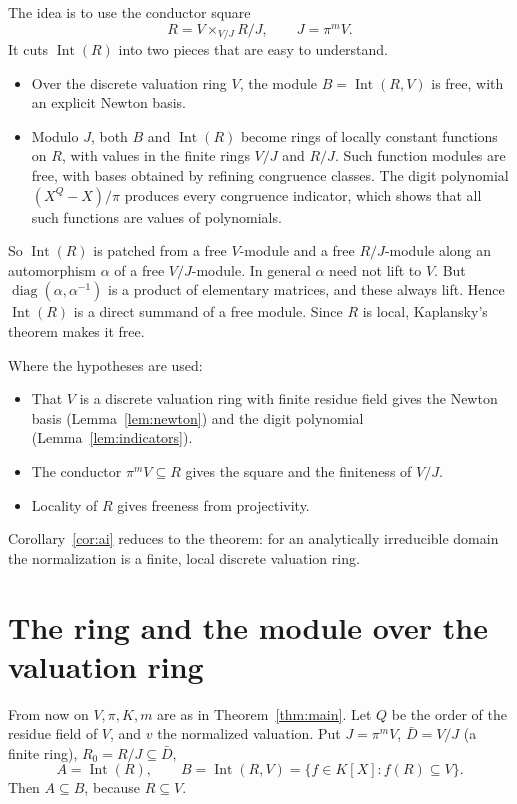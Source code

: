 \documentclass[11pt,a4paper]{article}
\theoremstyle{plain}
\theoremstyle{remark}
\newcommand{\Int}{\operatorname{Int}}
\begin{document}
The idea is to use the conductor square
\[
 R=V\times_{V/J}R/J,\qquad J=\pi^mV .
\]
It cuts $\Int(R)$ into two pieces that are easy to understand.
\begin{itemize}
\item Over the discrete valuation ring $V$, the module $B=\Int(R,V)$ is free, with an explicit Newton basis.
\item Modulo $J$, both $B$ and $\Int(R)$ become rings of locally constant functions on $R$, with values in the finite
rings $V/J$ and $R/J$. Such function modules are free, with bases obtained by refining congruence classes. The
digit polynomial $(X^Q-X)/\pi$ produces every congruence indicator, which shows that all such functions are values of
polynomials.
\end{itemize}
So $\Int(R)$ is patched from a free $V$-module and a free $R/J$-module along an automorphism $\alpha$ of a free
$V/J$-module. In general $\alpha$ need not lift to $V$. But $\operatorname{diag}(\alpha,\alpha^{-1})$ is a product
of elementary matrices, and these always lift. Hence $\Int(R)$ is a direct summand of a free module. Since $R$ is
local, Kaplansky's theorem makes it free.

Where the hypotheses are used:
\begin{itemize}
\item That $V$ is a discrete valuation ring with finite residue field gives the Newton basis (Lemma~\ref{lem:newton})
and the digit polynomial (Lemma~\ref{lem:indicators}).
\item The conductor $\pi^mV\subseteq R$ gives the square and the finiteness of $V/J$.
\item Locality of $R$ gives freeness from projectivity.
\end{itemize}
Corollary~\ref{cor:ai} reduces to the theorem: for an analytically irreducible domain the normalization is a finite,
local discrete valuation ring.

\section{The ring and the module over the valuation ring}

From now on $V,\pi,K,m$ are as in Theorem~\ref{thm:main}. Let $Q$ be the order of the residue field of $V$, and $v$
the normalized valuation. Put $J=\pi^mV$, $\bar D=V/J$ (a finite ring), $R_0=R/J\subseteq\bar D$,
\[
 A=\Int(R),\qquad B=\Int(R,V)=\{f\in K[X]:f(R)\subseteq V\}.
\]
Then $A\subseteq B$, because $R\subseteq V$.
\end{document}
